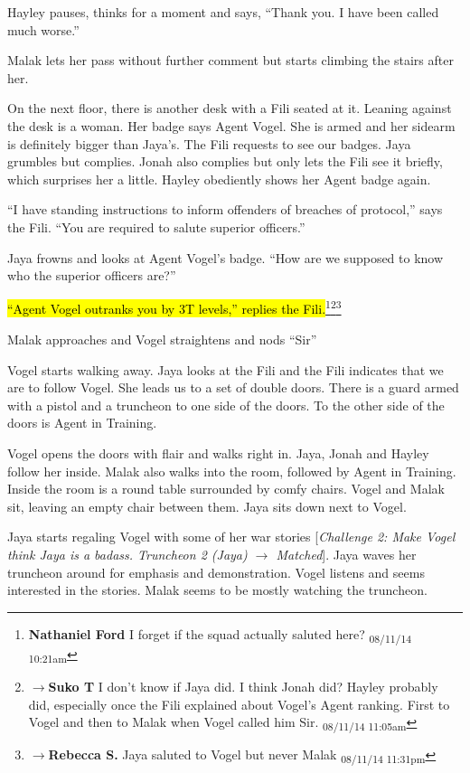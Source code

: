 Hayley pauses, thinks for a moment and says, ``Thank you.  I have been called much worse.''

Malak lets her pass without further comment but starts climbing the stairs after her.



On the next floor, there is another desk with a Fili seated at it.  Leaning against the desk is a woman. Her badge says Agent Vogel.  She is armed and her sidearm is definitely bigger than Jaya's.  The Fili requests to see our badges.  Jaya grumbles but complies.  Jonah also complies but only lets the Fili see it briefly, which surprises her a little.  Hayley obediently shows her Agent badge again.

``I have standing instructions to inform offenders of breaches of protocol,'' says the Fili.  ``You are required to salute superior officers.''

Jaya frowns and looks at Agent Vogel's badge.  ``How are we supposed to know who the superior officers are?''

\hl{``Agent Vogel outranks you by 3T levels,'' replies the Fili.}\footnote{\textbf{Nathaniel Ford }I forget if the squad actually saluted here? \textsubscript{08/11/14 10:21am}}\footnote{$\rightarrow$\textbf{Suko T }I don't know if Jaya did.  I think Jonah did?  Hayley probably did, especially once the Fili explained about Vogel's Agent ranking.  First to Vogel and then to Malak when Vogel called him Sir. \textsubscript{08/11/14 11:05am}}\footnote{$\rightarrow$\textbf{Rebecca S. }Jaya saluted to Vogel but never Malak \textsubscript{08/11/14 11:31pm}}

Malak approaches and Vogel straightens and nods ``Sir''



Vogel starts walking away.  Jaya looks at the Fili and the Fili indicates that we are to follow Vogel.  She leads us to a set of double doors.  There is a guard armed with a pistol and a truncheon to one side of the doors.  To the other side of the doors is Agent in Training.



Vogel opens the doors with flair and walks right in.  Jaya, Jonah and Hayley follow her inside.  Malak also walks into the room, followed by Agent in Training.  Inside the room is a round table surrounded by comfy chairs.  Vogel and Malak sit, leaving an empty chair between them.  Jaya sits down next to Vogel.  



Jaya starts regaling Vogel with some of her war stories {[}\textit{Challenge 2: Make Vogel think Jaya is a badass.  Truncheon 2 (Jaya) $\rightarrow$ Matched}{]}.  Jaya waves her truncheon around for emphasis and demonstration.  Vogel listens and seems interested in the stories.  Malak seems to be mostly watching the truncheon.



